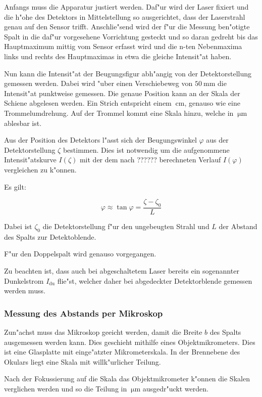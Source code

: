 			Anfangs muss die Apparatur justiert werden. Daf"ur wird der Laser fixiert und die h"ohe des Detektors in Mittelstellung so ausgerichtet, dass der Laserstrahl genau auf den Sensor trifft. Anschlie"send wird der f"ur die Messung ben"otigte Spalt in die daf"ur vorgesehene Vorrichtung gesteckt und so daran gedreht bis das Hauptmaximum mittig vom Sensor erfasst wird und die n-ten Nebenmaxima links und rechts des Hauptmaximas in etwa die gleiche Intensit"at haben.

			Nun kann die Intensit"at der Beugungsfigur abh"angig von der Detektorstellung gemessen werden. Dabei wird "uber einen Verschiebeweg von $\SI{50}{\milli\meter}$ die Intensit"at punktweise gemessen. Die genaue Position kann an der Skala der Schiene abgelesen werden. Ein Strich entspricht einem $\SI{}{\centi \meter}$, genauso wie eine Trommelumdrehung. Auf der Trommel kommt eine Skala hinzu, welche in $\SI{}{\micro \meter}$ ablesbar ist.


			Aus der Position des Detektors l"asst sich der Beugungswinkel $\varphi$ aus der Detektorstellung $\zeta$ bestimmen. Dies ist notwendig um die aufgenommene Intensit"atskurve $I(\zeta)$ mit der dem nach ?????? berechneten Verlauf $I(\varphi)$ vergleichen zu k"onnen.

			Es gilt:

			\begin{equation}
				\varphi \approx \tan{\varphi} = \frac{\zeta - \zeta_0}{L}
			\end{equation}

			Dabei ist $\zeta_0$ die Detektorstellung f"ur den ungebeugten Strahl und $L$ der Abstand des Spalts zur Detektoblende.

			F"ur den Doppelspalt wird genauso vorgegangen.

			Zu beachten ist, dass auch bei abgeschaltetem Laser bereits ein sogenannter Dunkelstrom $I_{\text{du}}$ flie"st, welcher daher bei abgedeckter Detektorblende gemessen werden muss.

		\subsubsection{Messung des Abstands per Mikroskop}
			\label{sec:messung_mikro}

			Zun"achst muss das Mikroskop geeicht werden, damit die Breite $b$ des Spalts ausgemessen werden kann. Dies geschieht mithilfe eines Objektmikrometers. Dies ist eine Glasplatte mit einge"atzter Mikrometerskala. In der Brennebene des Okulars liegt eine Skala mit willk"urlicher Teilung. 

			Nach der Fokussierung auf die Skala das Objektmikrometer k"onnen die Skalen verglichen werden und so die Teilung in $\SI{}{\micro \meter}$ ausgedr"uckt werden.
